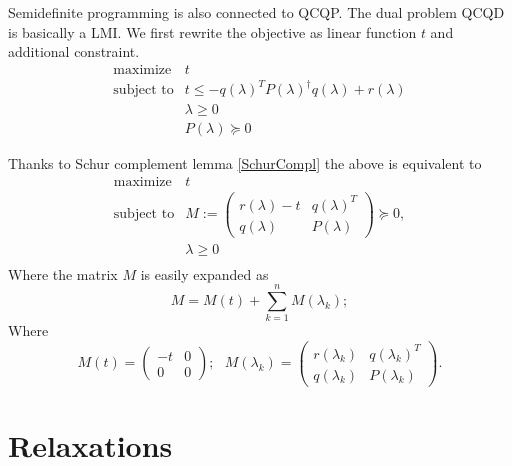 \documentclass[10pt,oneside]{book}
\theoremstyle{definition}
\begin{document}
Semidefinite programming is also connected to QCQP. The dual problem QCQD is basically a LMI. We first rewrite the objective as linear function $t$ and additional constraint.
\begin{equation}
\begin{array}{ll}
\mbox{maximize} & t \\
\mbox{subject to}&  t\leq -q(\lambda)^TP(\lambda)^{\dagger}q(\lambda) + r(\lambda) \\
&\lambda \geq 0\\
& P(\lambda )\succeq 0
\end{array} 
\end{equation}

Thanks to Schur complement lemma \ref{SchurCompl} the above is equivalent to
\begin{equation}
\begin{array}{ll}
\mbox{maximize} & t \\
\mbox{subject to}& M:=\left(\begin{array}{ll}
r(\lambda)-t & q(\lambda)^T \\
q(\lambda) & P(\lambda)
\end{array}\right)\succeq 0,
 \\
&\lambda \geq 0\\
\end{array} 
\end{equation}
Where the matrix $M$ is easily expanded as 
\begin{equation}
M=M(t) + \sum_{k=1}^n M(\lambda_k); 
\end{equation}
Where
\begin{equation}
M(t) = \left(\begin{array}{rr} -t& 0\\ 0 & 0 \end{array}\right) ; \ \ \ 
M(\lambda_k) = \left(\begin{array}{rr} r(\lambda_k)& q(\lambda_k)^T\\ q(\lambda_k) & P(\lambda_k) \end{array}\right) . 
\end{equation}












\section{Relaxations}
\end{document}
